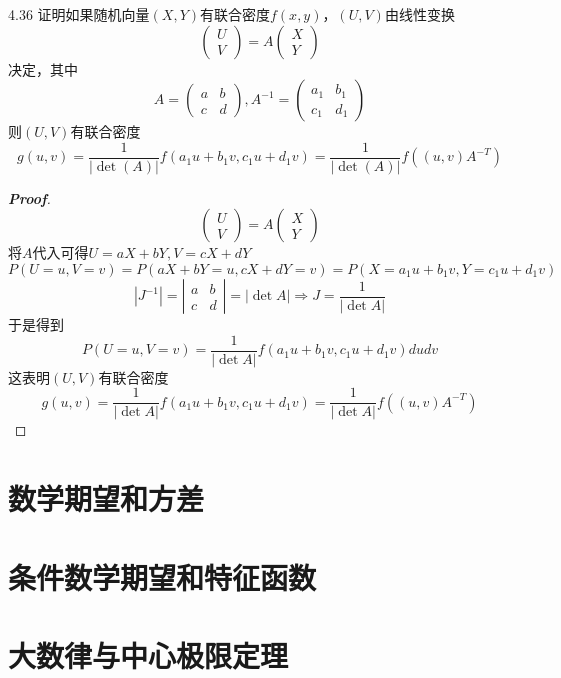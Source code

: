 \documentclass[10pt, a4paper, oneside]{ctexart}
\newenvironment{myproof}{\begin{proof}[\bf Proof]}{\end{proof}}
\begin{document}
4.36 证明如果随机向量$(X,Y)$有联合密度$f(x,y)$，$(U,V)$由线性变换
\[
\left(\begin{array}{cc}
     U \\
      V
\end{array}\right)=A\left(\begin{array}{cc}
     X \\
      Y
\end{array}\right)
\]
决定，其中
\[
A=\left(\begin{array}{cc}
     a &b \\
      c& d
\end{array}\right),A^{-1}=\left(\begin{array}{cc}
     a_1 &b_1 \\
      c_1& d_1
\end{array}\right)
\]
则$(U,V)$有联合密度
\[g(u,v) = \frac{1}{{|\det (A)|}}f({a_1}u + {b_1}v,{c_1}u + {d_1}v) = \frac{1}{{|\det (A)|}}f((u,v){A^{ - T}})\]
\begin{myproof}
\[
\left(\begin{array}{cc}
     U \\
      V
\end{array}\right)=A\left(\begin{array}{cc}
     X \\
      Y
\end{array}\right)
\]
将$A$代入可得$U=aX+bY,V=cX+dY$
   \[P(U = u,V = v) = P(aX + bY = u,cX + dY = v) = P(X = {a_1}u + {b_1}v,Y = {c_1}u + {d_1}v)\]
    \[|{J^{ - 1}}| = \left| {\begin{array}{*{20}{c}}
  a&b \\ 
  c&d 
\end{array}} \right| = |\det A| \Rightarrow J = \frac{1}{{|\det A|}}\]
于是得到
\[P(U = u,V = v) = \frac{1}{{|\det A|}}f({a_1}u + {b_1}v,{c_1}u + {d_1}v)dudv\]
这表明$(U,V)$有联合密度
\[g(u,v) = \frac{1}{{|\det A|}}f({a_1}u + {b_1}v,{c_1}u + {d_1}v) = \frac{1}{{|\det A|}}f((u,v){A^{ - T}})\]
\end{myproof}

\newpage
\section{数学期望和方差}
\newpage
\section{条件数学期望和特征函数}
\newpage
\section{大数律与中心极限定理}
\end{document}
